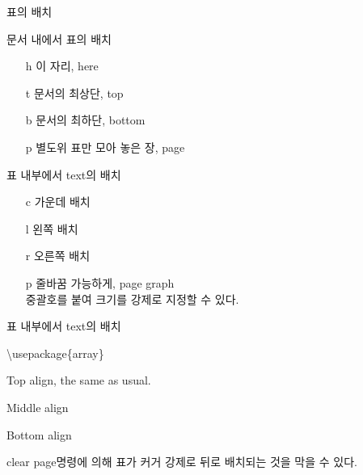 \documentclass[ aspectratio=149,  14pt,blue,xcolor=pdftex,dvipsnames,table,handout,notes]{beamer}
\begin{document}
		\begin{frame}[t]{표의 배치}

		\begin{block}{문서 내에서 표의 배치}
			\begin{itemize}
			\item[h] 이 자리, here
			\item[t] 문서의 최상단, top
			\item[b] 문서의 최하단, bottom
			\item[p] 별도위 표만 모아 놓은 장, page
			\end{itemize}
		\end{block}


		\begin{block}{표 내부에서 text의 배치}
			\begin{itemize}
			\item[c] 가운데 배치
			\item[l] 왼쪽 배치
			\item[r] 오른쪽 배치
			\item[p] 줄바꿈 가능하게, page graph\\
					중괄호를 붙여 크기를 강제로 지정할 수 있다.
			\end{itemize}
		\end{block}

		\begin{block}{표 내부에서 text의 배치}
			\begin{description}[12345678901234567890]
			\item[] \textbackslash usepackage\{array\}
			\item[]
			\item[p\{width\}] Top align, the same as usual.
			\item[m\{width\}] Middle align
			\item[b\{width\}] Bottom align
			\end{description}
		\end{block}

		clear page명령에 의해 표가 커거 강제로 뒤로 배치되는 것을 막을 수 있다.
		\end{frame}
\end{document}
